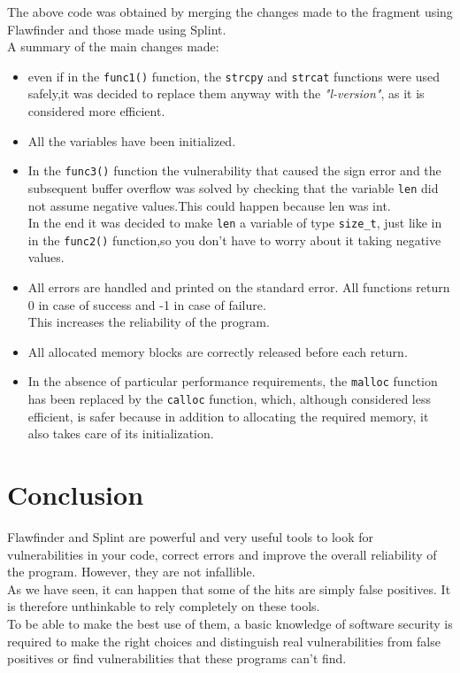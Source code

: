 \documentclass[a4paper,12pt]{article}
\begin{document}
The above code was obtained by merging the changes made to the fragment using Flawfinder and those made using Splint.\\
A summary of the main changes made:
\begin{itemize}
  \item even if in the \texttt{func1()} function, the \texttt{strcpy} and \texttt{strcat} functions were used safely,it was decided to replace them anyway with the \textit{"l-version"}, as it is considered more efficient.
  \item All the variables have been initialized.
  \item In the \texttt{func3()} function the vulnerability that caused the sign error and the subsequent buffer overflow was solved by checking that the variable \texttt{len} did not assume negative values.This could happen because len was int.\\
In the end it was decided to make \texttt{len} a variable of type \texttt{size\_t}, just like in in the \texttt{func2()} function,so you don't have to worry about it taking negative values.
\item All errors are handled and printed on the standard error.
All functions return 0 in case of success and -1 in case of failure.\\
This increases the reliability of the program.
\item All allocated memory blocks are correctly released before each return.
\item In the absence of particular performance requirements, the \texttt{malloc} function has been replaced by the \texttt{calloc} function, which, although considered less efficient, is safer because in addition to allocating the required memory, it also takes care of its initialization.
\end{itemize}
\section{Conclusion}

Flawfinder and Splint are powerful and very useful tools to look for vulnerabilities in your code, correct errors and improve the overall reliability of the program.
However, they are not infallible.\\
As we have seen, it can happen that some of the hits are simply false positives. It is therefore unthinkable to rely completely on these tools.\\
To be able to make the best use of them, a basic knowledge of software security is required to make the right choices and distinguish real vulnerabilities from false positives or find vulnerabilities that these programs can't find.
\end{document}
